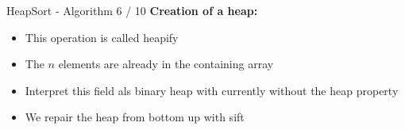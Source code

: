 
\begin{frame}{HeapSort - Algorithm 6 / 10}
  \textbf{Creation of a heap:}
  \begin{itemize}
    \item
      This operation is called {\color{Mittel-Blau}heapify}
    \item
      The {\color{Mittel-Blau}$n$} elements are already in the containing array
    \item
      Interpret this field als binary heap with currently without the
      {\color{Mittel-Blau}heap property}
    \item
      We repair the heap from bottom up with {\color{Mittel-Blau}sift}
  \end{itemize}
\end{frame}


